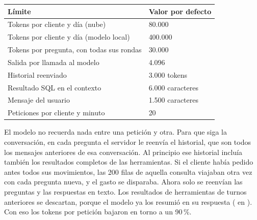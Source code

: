 {\small
\begin{tabularx}{\textwidth}{@{}LP{4.5cm}@{}}
\toprule
\textbf{Límite} & \textbf{Valor por defecto} \\
\midrule
Tokens por cliente y día (nube) & 80.000 \\
Tokens por cliente y día (modelo local) & 400.000 \\
Tokens por pregunta, con todas sus rondas & 30.000 \\
Salida por llamada al modelo & 4.096 \\
Historial reenviado & 3.000 tokens \\
Resultado SQL en el contexto & 6.000 caracteres \\
Mensaje del usuario & 1.500 caracteres \\
Peticiones por cliente y minuto & 20 \\
\bottomrule
\end{tabularx}}

El modelo no recuerda nada entre una petición y otra. Para que siga la conversación, en cada pregunta el servidor le
reenvía el historial, que son todos los mensajes anteriores de esa conversación. Al principio ese historial incluía
también los resultados completos de las herramientas. Si el cliente había pedido antes todos sus movimientos, las 200
filas de aquella consulta viajaban otra vez con cada pregunta nueva, y el gasto se disparaba. Ahora solo se reenvían
las preguntas y las respuestas en texto. Los resultados de herramientas de turnos anteriores se descartan, porque el
modelo ya los resumió en su respuesta ( en ). Con eso los tokens
por petición bajaron en torno a un 90\,\%.
